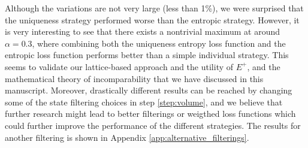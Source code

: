 Although the variations are not very large (less than 1\%), we were surprised that the uniqueness strategy performed worse than the entropic strategy. However, it is very interesting to see that there exists a nontrivial maximum at around $\alpha = 0.3$, where combining both the uniqueness entropy loss function and the entropic loss function performs better than a simple individual strategy. This seems to validate our lattice-based approach and the utility of $E^+$, and the mathematical theory of incomparability that we have discussed in this manuscript. Moreover, drastically different results can be reached by changing some of the state filtering choices in step \ref{step:volume}, and we believe that further research might lead to better filterings or weigthed loss functions which could further improve the performance of the different strategies. The results for another filtering is shown in Appendix \ref{app:alternative_filterings}.
